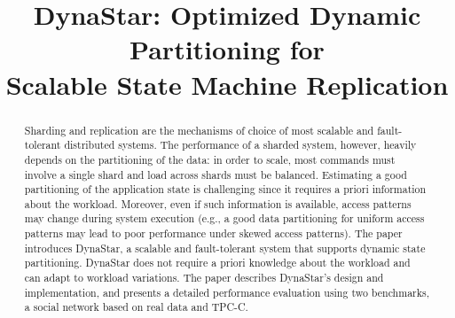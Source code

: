 \documentclass[svgnames,sigplan,10pt]{IEEEtran}
\newcommand{\dynastar}{\mbox{DynaStar}\xspace}
\begin{document}
\title{\dynastar: Optimized Dynamic Partitioning for\\ Scalable State Machine Replication}

\author{
\and
{}
\and
{}
\and
{}
\and
{}
\and
{}}

\maketitle
\thispagestyle{plain}
\pagestyle{plain}

\begin{abstract}

Sharding and replication are the mechanisms of choice of most scalable and fault-tolerant distributed systems.
The performance of a sharded system, however, heavily depends on the partitioning of the data: in order to scale, most commands must involve a single shard and load across shards must be balanced.
Estimating a good partitioning of the application state is challenging since it requires a priori information about the workload.
Moreover, even if such information is available, access patterns may change during system execution (e.g., a good data partitioning for uniform access patterns may lead to poor performance under skewed access patterns).
The paper introduces DynaStar, a scalable and fault-tolerant system that supports dynamic state partitioning.
DynaStar does not require a priori knowledge about the workload and can adapt to workload variations.
The paper describes DynaStar's design and implementation, and presents a detailed performance evaluation using two benchmarks, a social network based on real data and TPC-C.

\end{abstract}













%
\end{document}
